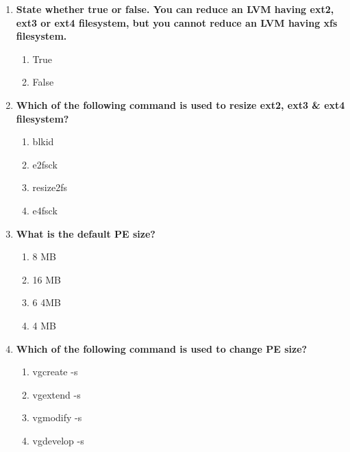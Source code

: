 \begin{flushleft}
\begin{enumerate}
		\item \textbf{State whether true or false. You can reduce an LVM having ext2, ext3 or ext4 filesystem, but you cannot reduce an LVM having xfs filesystem.}
		\begin{enumerate}[label=(\alph*)]
			\item True %
			\item False
		\end{enumerate}
		\bigskip
		\bigskip
		

		\item \textbf{Which of the following command is used to resize ext2, ext3 \& ext4 filesystem?}
		\begin{enumerate}[label=(\alph*)]
			\item blkid
			\item e2fsck
			\item resize2fs   %
			\item e4fsck
		\end{enumerate}
		\bigskip
		\bigskip	


		\item \textbf{What is the default PE size?}
		\begin{enumerate}[label=(\alph*)]
			\item 8 MB
			\item 16 MB
			\item 6 4MB
			\item 4 MB   %
		\end{enumerate}
		\bigskip
		\bigskip	

		\item \textbf{Which of the following command is used to change PE size?}
		\begin{enumerate}[label=(\alph*)]
			\item vgcreate -s  %
			\item vgextend -s  
			\item vgmodify -s 
			\item vgdevelop -s  %
		\end{enumerate}
		\bigskip
		\bigskip	
		
	\end{enumerate}
	
	
\end{flushleft}

\newpage

